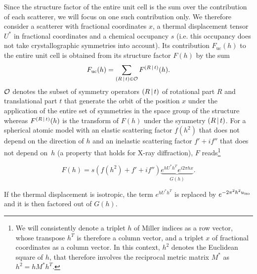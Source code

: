 \documentclass[pdf]{iucr}
\begin{document}
\newcommand{\Fuc}{F_{\text{uc}}}

Since the structure factor of the entire unit cell is the sum over the contribution of each scatterer, we will focus on one such contribution only. We therefore consider a scatterer with  fractional coordinates $x$, a thermal displacement tensor $U^*$ in fractional coordinates and a chemical occupancy $s$ (i.e. this occupancy does not take crystallographic symmetries into account).  Its contribution $\Fuc(h)$ to the entire unit cell is obtained from its  structure factor $F(h)$  by the sum
\begin{equation}
\Fuc(h) = \sum_{\sym{R}{t} \in \cal{O}} F^{\sym{R}{t}}(h).
\end{equation}
$\cal{O}$ denotes the subset of symmetry operators $\left( R\,\vert\, t \right)$ of rotational part $R$ and translational part $t$ that generate the orbit of the position $x$ under the application of the entire set of symmetries in the space group of the structure whereas $F^{\left( R\,\vert\, t \right)}(h)$ is the transform of $F(h)$ under the symmetry $\left( R\,\vert\, t \right)$. For a spherical atomic model with an elastic scattering factor $f(h^2)$ that does not depend on the direction of $h$ and an inelastic scattering factor $f' + if''$ that does not depend on~$h$ (a property that holds for X-ray diffraction), $F$ reads\footnote{We will consistently denote a triplet $h$ of Miller indices as a row vector, whose transpose $h^T$ is therefore a column vector, and a triplet $x$ of fractional coordinates as a column vector. In this context, $h^2$ denotes the Euclidean square of $h$, that therefore involves the reciprocal metric matrix $M^*$ as $h^2 = h M^* h^T$.}

\begin{equation}
F(h) = s (f(h^2) + f' + i f'') \underbrace{e^{h U^* h^T} e^{i 2\pi h x}}_{G(h)}.
\end{equation}

If the thermal displacement is isotropic, the term $e^{h U^* h^T}$ is replaced by $e^{-2\pi^2 h^2 u_{\text{iso}}}$ and it is then factored out of $G(h)$.
\end{document}
